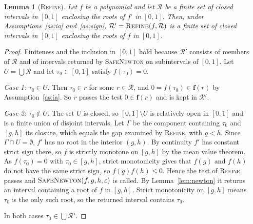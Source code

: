 \documentclass[final,5p,times,twocolumn]{elsarticle}
\newtheorem{lemma}{Lemma}
\theoremstyle{definition}
\newcommand{\iv}[1]{\mathbf{#1}}
\begin{document}
\begin{lemma}[\textsc{Refine}]\label{lem:refine}
Let $f$ be a polynomial and let $\mathcal{R}$ be a finite set of closed intervals in $[0,1]$ enclosing the roots of $f'$ in $[0,1]$. Then, under Assumptions~\ref{as:ia} and~\ref{as:sign}, $\mathcal{R}'=\textsc{Refine}(f,\mathcal{R})$ is a finite set of closed intervals in $[0,1]$ enclosing the roots of $f$ in $[0,1]$.
\end{lemma}
\begin{proof}
Finiteness and the inclusion in $[0,1]$ hold because $\mathcal{R}'$ consists of members of $\mathcal{R}$ and of intervals returned by \textsc{SafeNewton} on subintervals of $[0,1]$. Let $U=\bigcup\mathcal{R}$ and let $\tau_0\in[0,1]$ satisfy $f(\tau_0)=0$.

\emph{Case 1: $\tau_0\in U$.} Then $\tau_0\in r$ for some $r\in\mathcal{R}$, and $0=f(\tau_0)\in\iv{f}(r)$ by Assumption~\ref{as:ia}. So $r$ passes the test $0\in\iv{f}(r)$ and is kept in $\mathcal{R}'$.

\emph{Case 2: $\tau_0\notin U$.} The set $U$ is closed, so $[0,1]\setminus U$ is relatively open in $[0,1]$ and is a finite union of disjoint intervals. Let $\Gamma$ be the component containing $\tau_0$ and $[g,h]$ its closure, which equals the gap examined by \textsc{Refine}, with $g<h$. Since $\Gamma\cap U=\emptyset$, $f'$ has no root in the interior $(g,h)$. By continuity $f'$ has constant strict sign there, so $f$ is strictly monotone on $[g,h]$ by the mean value theorem. As $f(\tau_0)=0$ with $\tau_0\in[g,h]$, strict monotonicity gives that $f(g)$ and $f(h)$ do not have the same strict sign, so $f(g)f(h)\le0$. Hence the test of \textsc{Refine} passes and $\textsc{SafeNewton}(f,g,h,\varepsilon)$ is called. By Lemma~\ref{lem:newton} it returns an interval containing a root of $f$ in $[g,h]$. Strict monotonicity on $[g,h]$ means $\tau_0$ is the only such root, so the returned interval contains $\tau_0$.

In both cases $\tau_0\in\bigcup\mathcal{R}'$.
\end{proof}
\end{document}
